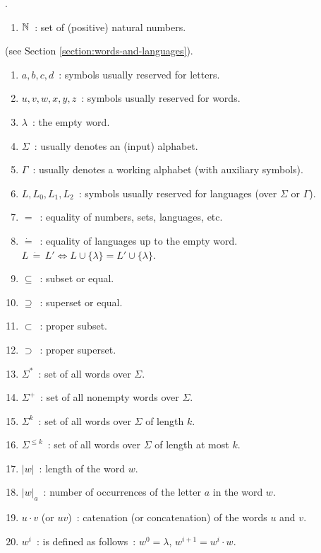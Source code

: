 
.

\begin{enumerate}[]
\item $\mathbb{N}$\ : set of (positive) natural numbers.
\end{enumerate}

 (see Section \ref{section:words-and-languages}).

\begin{enumerate}[]
\item $a, b, c, d$\ : symbols usually reserved for letters.
\item $u, v, w, x, y, z$\ : symbols usually reserved for words.
\item $\lambda$\ : the empty word.
\item $\Sigma$\ : usually denotes an (input) alphabet.
\item $\Gamma$\ : usually denotes a working alphabet (with auxiliary symbols).
\item $L, L_0, L_1, L_2$\ : symbols usually reserved for languages (over $\Sigma$ or $\Gamma$).
\item $=$\ : equality of numbers, sets, languages, etc.
\item $\dot{=}$\ : equality of languages up to the empty word. $L\, \dot{=}\, L' \Leftrightarrow L \cup \{\lambda\} = L' \cup \{\lambda\}$.
\item $\subseteq$\ : subset or equal.
\item $\supseteq$\ : superset or equal.
\item $\subset$\ : proper subset.
\item $\supset$\ : proper superset.
\item $\Sigma^*$\ : set of all words over $\Sigma$.
\item $\Sigma^+$\ : set of all nonempty words over $\Sigma$.
\item $\Sigma^k$\ : set of all words over $\Sigma$ of length $k$.
\item $\Sigma^{\le k}$\ : set of all words over $\Sigma$ of length at most $k$.
\item $|w|$\ : length of the word $w$.
\item $|w|_a$\ : number of occurrences of the letter $a$ in the word $w$.
\item $u \cdot v$ (or $uv$)\ : catenation (or concatenation) of the words $u$ and $v$.
\item $w^i$\ : is defined as follows\ : $w^0 = \lambda$, $w^{i+1} = w^i \cdot w$.

\end{enumerate}
